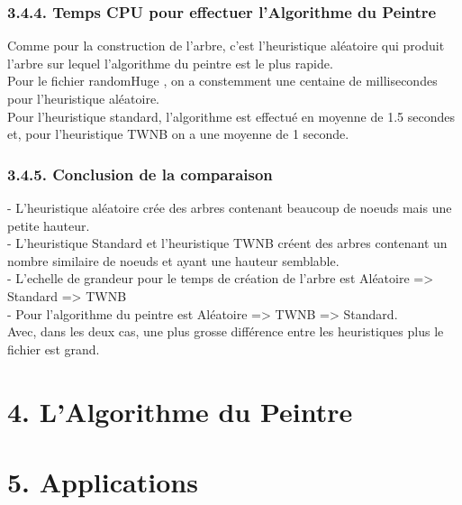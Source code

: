 \documentclass[a4paper,12pt]{report}	%
\begin{document}
    {\subsubsection*{3.4.4. Temps CPU pour effectuer l'Algorithme du Peintre}}
      Comme pour la construction de l'arbre, c'est l'heuristique aléatoire qui produit l'arbre sur lequel l'algorithme du peintre est le plus rapide. \\
\indent Pour le fichier randomHuge , on a constemment une centaine de millisecondes pour l'heuristique aléatoire. \\ 
\indent Pour l'heuristique standard, l'algorithme est effectué en moyenne de 1.5 secondes et, pour l'heuristique TWNB on a une moyenne de 1 seconde.\\
    
    {\subsubsection*{3.4.5. Conclusion de la comparaison}}
     - L'heuristique aléatoire crée des arbres contenant beaucoup de noeuds mais une petite hauteur.\\
\indent - L'heuristique Standard et l'heuristique TWNB créent des arbres contenant un nombre similaire de noeuds et ayant une hauteur semblable. \\
\indent - L'echelle de grandeur pour le temps de création de l'arbre est Aléatoire => Standard => TWNB \\
\indent - Pour l'algorithme du peintre est Aléatoire => TWNB => Standard.\\
 Avec, dans les deux cas, une plus grosse différence entre les heuristiques plus le fichier est grand.
    
    \newpage
  
    {\section*{4. L'Algorithme du Peintre}}
    
    \newpage
    
    {\section*{5. Applications}}
	
\end{document}

